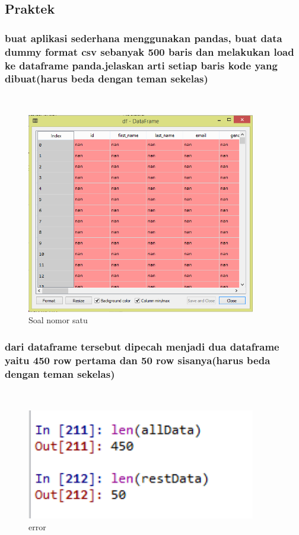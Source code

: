 \subsection{Praktek}

	\subsubsection{buat aplikasi sederhana menggunakan pandas, buat data dummy format csv sebanyak 500 baris dan melakukan load ke dataframe panda.jelaskan arti setiap baris kode yang dibuat(harus beda dengan teman sekelas)}\hfill\\
	
	
	
	\begin{figure}[H]
		\begin{center}
		 \includegraphics[width=10cm]{figures/1174076/figures4/6.png}
		 \caption{Soal nomor satu}	
		\end{center}
	\end{figure}	
	
	
	\subsubsection{ dari dataframe tersebut dipecah menjadi dua dataframe yaitu 450 row pertama dan 50 row sisanya(harus beda dengan teman sekelas)}\hfill\\

	
	
	\begin{figure}[H]
		\begin{center}
		 \includegraphics[width=10cm]{figures/1174076/figures4/7.png}
		 \caption{error}	
		\end{center}
	\end{figure}


